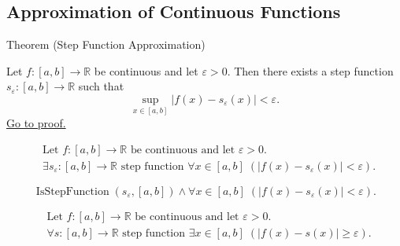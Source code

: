 
\subsection*{Approximation of Continuous Functions}
\label{sec:approximation}

\begin{theorembox}{Theorem (Step Function Approximation)}
\begin{theorem}
\label{thm:step-function-approximation}
Let $f:[a,b]\to\mathbb{R}$ be continuous and let $\varepsilon>0$.
Then there exists a step function $s_\varepsilon:[a,b]\to\mathbb{R}$ such that
\[
\sup_{x\in[a,b]} |f(x)-s_\varepsilon(x)|<\varepsilon.
\]
\hyperref[prf:step-function-approximation]{Go to proof.}
\end{theorem}
\end{theorembox}

\begin{remark*}
\[
\begin{aligned}
&\text{Let } f:[a,b]\to\mathbb{R} \text{ be continuous and let } \varepsilon>0.\\
&\exists s_\varepsilon:[a,b]\to\mathbb{R} \text{ step function } \forall x\in[a,b]\;(|f(x)-s_\varepsilon(x)|<\varepsilon).
\end{aligned}
\]
\end{remark*}

\begin{remark*}
\[
\operatorname{IsStepFunction}(s_\varepsilon,[a,b])
\land
\forall x\in[a,b]\;(|f(x)-s_\varepsilon(x)|<\varepsilon).
\]
\end{remark*}

\begin{remark*}
\[
\begin{aligned}
&\text{Let } f:[a,b]\to\mathbb{R} \text{ be continuous and let } \varepsilon>0.\\
&\forall s:[a,b]\to\mathbb{R} \text{ step function } \exists x\in[a,b]\;(|f(x)-s(x)|\ge\varepsilon).
\end{aligned}
\]
\end{remark*}

